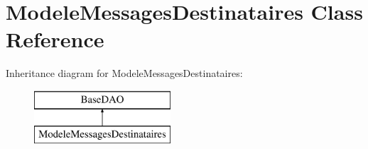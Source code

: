 \hypertarget{class_modele_messages_destinataires}{}\section{Modele\+Messages\+Destinataires Class Reference}
\label{class_modele_messages_destinataires}
Inheritance diagram for Modele\+Messages\+Destinataires\+:\begin{figure}[H]
\begin{center}
\leavevmode
\includegraphics[height=2.000000cm]{class_modele_messages_destinataires}
\end{center}
\end{figure}
